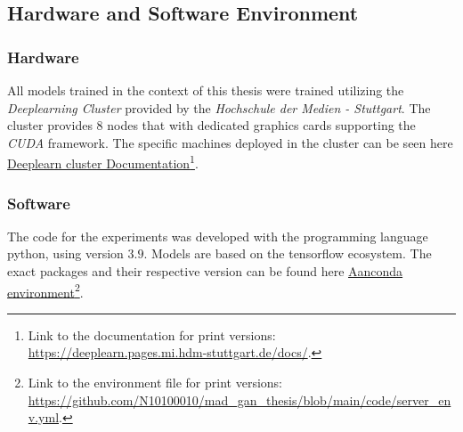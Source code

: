 \subsection{Hardware and Software Environment}

\subsubsection{Hardware}
All models trained in the context of this thesis were trained utilizing the \textit{Deeplearning Cluster} provided by the \textit{Hochschule der Medien - Stuttgart}. The cluster provides 8 nodes that with dedicated graphics cards supporting the \textit{CUDA} framework. The specific machines deployed in the cluster can be seen here \href{https://deeplearn.pages.mi.hdm-stuttgart.de/docs/}{Deeplearn cluster Documentation}\footnote{Link to the documentation for print versions: \url{https://deeplearn.pages.mi.hdm-stuttgart.de/docs/}.}.

\subsubsection{Software}
The code for the experiments was developed with the programming language python, using version \(3.9\). Models are based on the tensorflow ecosystem. The exact packages and their respective version can be found here \href{https://github.com/N10100010/mad_gan_thesis/blob/main/code/server_env.yml}{Aanconda environment}\footnote{Link to the environment file for print versions: \url{https://github.com/N10100010/mad_gan_thesis/blob/main/code/server_env.yml}.}.



\newpage

